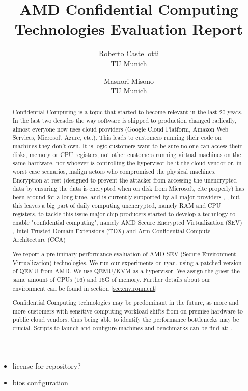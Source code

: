 \documentclass[twocolumn]{article}
\begin{document}
\date{}
\title{\Large \bf AMD Confidential Computing Technologies Evaluation Report}
\author{{\rm Roberto Castellotti}\\TU Munich \and {\rm Masnori Misono}\\TU Munich}
\maketitle

\begin{itemize}
    \item license for repository?
    \item bios configuration
\end{itemize}

\begin{abstract}
    Confidential Computing is a topic that started to become relevant in the last 20 years. In the last two decades the way software is shipped to production changed radically, almost everyone now uses cloud providers (Google Cloud Platform, Amazon Web Services, Microsoft Azure, etc.). This leads to customers running their code on machines they don't own. It is logic customers want to be sure no one can access their disks, memory or CPU registers, not other customers running virtual machines on the same hardware, nor whoever is controlling the hypervisor be it  the cloud vendor  or, in worst case scenarios, malign actors who compromised the physical machines. Encryption at rest (designed to prevent the attacker from accessing the unencrypted data by ensuring the data is encrypted when on disk from Microsoft, cite properly) has been around for a long time, and is currently supported by all major providers \cite{aws-enc}, \cite{gcp-enc}, \cite{azure-enc} but this leaves a big part of daily computing unencrypted, namely RAM and CPU registers, to tackle this issue major chip producers started to develop a technlogy to enable "confidential computing", 
    namely AMD Secure Encrypted Virtualization (SEV) \cite{memory-encryption}, Intel Trusted Domain Extensions (TDX) \cite{tdx} and Arm Confidential Compute Architecture (CCA) \cite{cca}

    We report a preliminary performance evaluation of AMD SEV (Secure Environment Virtualization) technologies.
    We run our experiments on ryan, using a patched version of QEMU from AMD. We use QEMU/KVM as a hypervisor. We assign the guest the same amount of CPUs (16) and 16G of memory. Further details about our environment can be found in section \ref{sec:environment}
    
    Confidential Computing technologies may be predominant in the future, as more and more customers with sensitive computing workload shifts from on-premise hardware to public cloud vendors, thus being able to identify the performance bottlenecks may be crucial. Scripts to launch and configure machines and benchmarks can be find at: \href{https://github.com/rcastellotti/gr}.  
\end{abstract}
\end{document}
